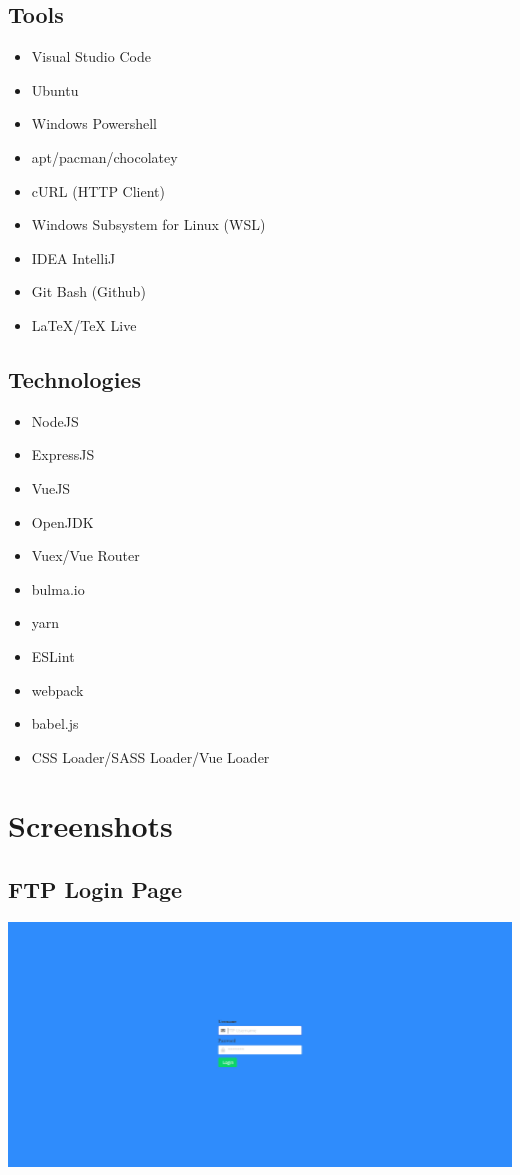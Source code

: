 \documentclass[12pt]{article}
\begin{document}
\subsection{Tools}
\begin{itemize}
	\item Visual Studio Code
	\item Ubuntu
	\item Windows Powershell
	\item apt/pacman/chocolatey
	\item cURL (HTTP Client)
	\item Windows Subsystem for Linux (WSL)
	\item IDEA IntelliJ
	\item Git Bash (Github)
	\item LaTeX/TeX Live
\end{itemize}
\subsection{Technologies}
\begin{itemize}
	\item NodeJS
	\item ExpressJS
	\item VueJS
	\item OpenJDK
	\item Vuex/Vue Router
	\item bulma.io
	\item yarn
	\item ESLint
	\item webpack
	\item babel.js
	\item CSS Loader/SASS Loader/Vue Loader
\end{itemize}


\section{Screenshots}
\subsection{FTP Login Page}
\includegraphics[scale=0.3]{images/login.png}
\end{document}
